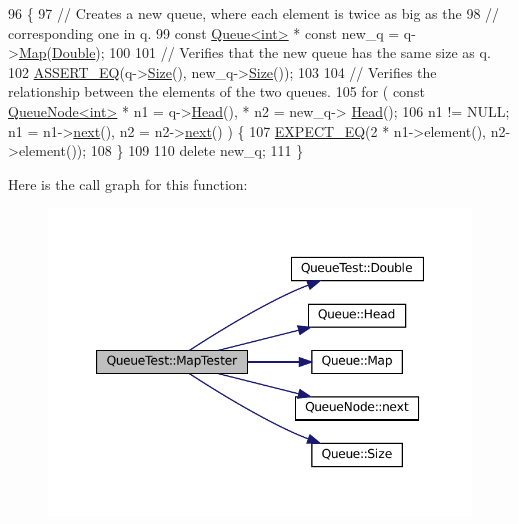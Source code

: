 \begin{DoxyCode}
96                                        \{
97     \textcolor{comment}{// Creates a new queue, where each element is twice as big as the}
98     \textcolor{comment}{// corresponding one in q.}
99     \textcolor{keyword}{const} \hyperlink{classQueue}{Queue<int>} * \textcolor{keyword}{const} new\_q = q->\hyperlink{classQueue_a904a696292fc593adc6fd21fb229d760}{Map}(\hyperlink{classQueueTest_a2c7e0d1edb558dbbc4c085316d3d1ee6}{Double});
100 
101     \textcolor{comment}{// Verifies that the new queue has the same size as q.}
102     \hyperlink{gtest_8h_a1a6db8b1338ee7040329322b77779086}{ASSERT\_EQ}(q->\hyperlink{classQueue_abc4d78b5f66041011c5590bf703847b0}{Size}(), new\_q->\hyperlink{classQueue_abc4d78b5f66041011c5590bf703847b0}{Size}());
103 
104     \textcolor{comment}{// Verifies the relationship between the elements of the two queues.}
105     \textcolor{keywordflow}{for} ( \textcolor{keyword}{const} \hyperlink{classQueueNode}{QueueNode<int>} * n1 = q->\hyperlink{classQueue_a71aa0154ef75bb87a53b6af1829fcd5e}{Head}(), * n2 = new\_q->
      \hyperlink{classQueue_a71aa0154ef75bb87a53b6af1829fcd5e}{Head}();
106           n1 != NULL; n1 = n1->\hyperlink{classQueueNode_a8a9fdf488da06533360999ef85db56ea}{next}(), n2 = n2->\hyperlink{classQueueNode_a8a9fdf488da06533360999ef85db56ea}{next}() ) \{
107       \hyperlink{gtest_8h_a4159019abda84f5366acdb7604ff220a}{EXPECT\_EQ}(2 * n1->element(), n2->element());
108     \}
109 
110     \textcolor{keyword}{delete} new\_q;
111   \}
\end{DoxyCode}
Here is the call graph for this function\+:
\nopagebreak
\begin{figure}[H]
\begin{center}
\leavevmode
\includegraphics[width=347pt]{classQueueTest_a7f1661cd16c428a130d6ac1e4246eaab_cgraph}
\end{center}
\end{figure}
